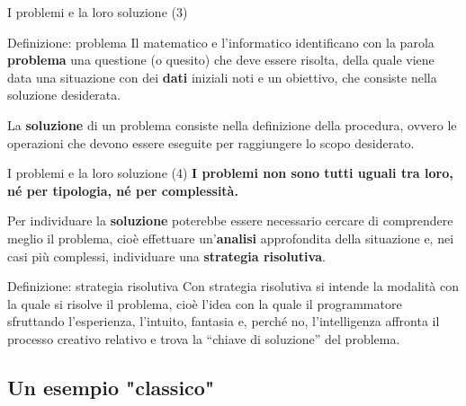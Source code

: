 \documentclass[
    notheorems,
    11pt,
    compress,
    aspectratio=169
]{beamer}
\begin{document}
\begin{frame}{I problemi e la loro soluzione (3)}
    \begin{block}{Definizione: problema}
        Il matematico e l’informatico identificano con la parola \textbf{problema} una questione (o quesito) che deve essere risolta, della quale viene data una situazione con dei \textbf{dati} iniziali noti e un obiettivo, che consiste nella soluzione desiderata.

        \vspace{0.25cm}
        
        La \textbf{soluzione} di un problema consiste nella definizione della procedura, ovvero le operazioni che devono essere eseguite per raggiungere lo scopo desiderato.
    \end{block}
\end{frame}

\begin{frame}{I problemi e la loro soluzione (4)}
    \textbf{I problemi non sono tutti uguali tra loro, né per tipologia, né per complessità.}
    
    \pause
    
    Per individuare la \textbf{soluzione} poterebbe essere necessario cercare di comprendere meglio il problema, cioè effettuare un’\textbf{analisi} approfondita della situazione e, nei casi più complessi, individuare una \textbf{strategia risolutiva}.

    \pause
    \vfill

    \begin{block}{Definizione: strategia risolutiva}
        Con strategia risolutiva si intende la modalità con la quale si risolve il problema, cioè l’idea con la quale il programmatore sfruttando l’esperienza, l’intuito, fantasia e, perché no, l’intelligenza affronta il processo creativo relativo e trova la “chiave di soluzione” del problema.
    \end{block}
\end{frame}


\subsection{Un esempio "classico"}
\end{document}
